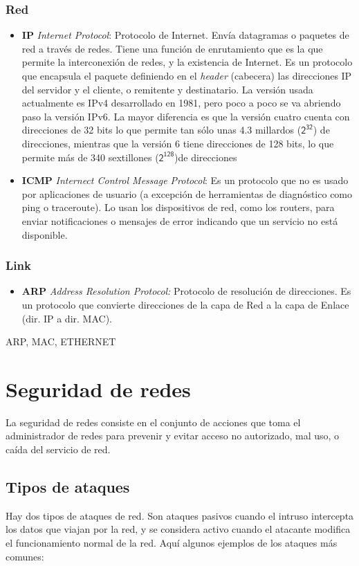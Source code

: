 \documentclass[a4paper, 11pt]{report} %
\begin{document}
\subsubsection{Red}
\begin{itemize}
\item \textbf{IP} \textit{Internet Protocol}: Protocolo de Internet. Envía datagramas o paquetes de red a través de redes. Tiene una función de enrutamiento que es la que permite la interconexión de redes, y la existencia de Internet. Es un protocolo que encapsula el paquete definiendo en el \textit{header} (cabecera) las direcciones IP del servidor y el cliente, o remitente y destinatario. La versión usada actualmente es IPv4 desarrollado en 1981, pero poco a poco se va abriendo paso la versión IPv6. La mayor diferencia es que la versión cuatro cuenta con direcciones de 32 bits lo que permite tan sólo unas 4.3 millardos ($\mathsf{2^{32}}$) de direcciones, mientras que la versión 6 tiene direcciones de 128 bits, lo que permite más de 340 sextillones ($\mathsf{2^{128}}$)de direcciones
\item \textbf{ICMP} \textit{Internect Control Message Protocol}: Es un protocolo que no es usado por aplicaciones de usuario (a excepción de herramientas de diagnóstico como ping o traceroute). Lo usan los dispositivos de red, como los routers, para enviar notificaciones o mensajes de error indicando que un servicio no está disponible.
\end{itemize}
\subsubsection{Link}
\begin{itemize}
\item \textbf{ARP} \textit{Address Resolution Protocol:} Protocolo de resolución de direcciones. Es un protocolo que convierte direcciones de la capa de Red a la capa de Enlace (dir. IP a dir. MAC). 
\end{itemize}
ARP, MAC, ETHERNET

\section{Seguridad de redes}
La seguridad de redes consiste en el conjunto de acciones que toma el administrador de redes para prevenir y evitar acceso no autorizado, mal uso, o caída del servicio de red.
\subsection{Tipos de ataques}
Hay dos tipos de ataques de red. Son ataques pasivos cuando el intruso intercepta los datos que viajan por la red, y se considera activo cuando el atacante modifica el funcionamiento normal de la red. Aquí algunos ejemplos de los ataques más comunes:
\end{document}
